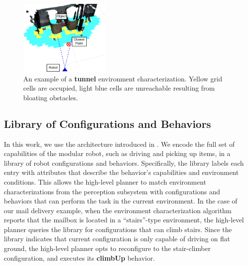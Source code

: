 \documentclass[journal]{IEEEtran}
\begin{document}
%
\begin{figure}
\begin{center}
\includegraphics[width=0.4\textwidth]{images/characterization.png}
\caption{An example of a \textbf{tunnel} environment characterization. Yellow grid cells are occupied, light blue cells are unreachable resulting from bloating obstacles.}
\label{fig:characterization}
\end{center}
\vspace{-4em}
\end{figure}

\subsection{Library of Configurations and Behaviors}
\label{sec:configuration-specifics}
%
In this work, we use the architecture introduced in \cite{Jing2016}. We encode the full set of capabilities of the modular robot, such as driving and picking up items, in a library of robot configurations and behaviors.
Specifically, the library labels each entry with attributes that describe the behavior's capabilities and environment conditions. 
This allows the high-level planner to match environment characterizations from the perception subsystem with configurations and behaviors that can perform the task in the current environment. 
In the case of our mail delivery example, when the environment characterization algorithm reports that the mailbox is located in a ``stairs''-type environment, the high-level planner queries the library for configurations that can climb stairs.  
Since the library indicates that current configuration is only capable of driving on flat ground, the high-level planner opts to reconfigure to the stair-climber configuration, and executes its \textbf{climbUp} behavior.
\end{document}
